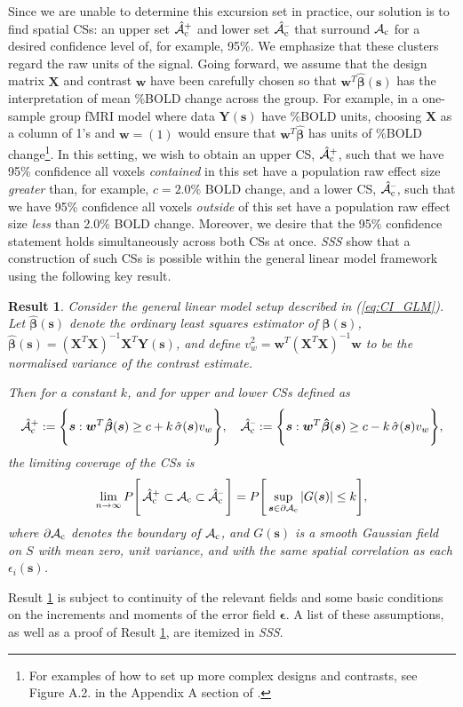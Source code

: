 Since we are unable to determine this excursion set in practice, our solution is to find spatial CSs: an upper set $\operatorname{\hat{\mathcal{A}}_{c}^+}$ and lower set $\operatorname{\hat{\mathcal{A}}_{c}^{\textrm{--}}}$ that surround $\operatorname{\mathcal{A}_{c}}$ for a desired confidence level of, for example, 95\%. We emphasize that these clusters regard the raw units of the signal. Going forward, we assume that the design matrix $\bm{X}$ and contrast $\bm{w}$ have been carefully chosen so that $\bm{w}^{T}\hat{\bm{\beta}}(\bm{s})$ has the interpretation of mean \%BOLD change across the group. For example, in a one-sample group fMRI model where data $\bm{Y}(\bm{s})$ have \%BOLD units, choosing $\bm{X}$ as a column of 1's and $\bm{w}=(1)$ would ensure that $\bm{w}^{T}\hat{\bm{\beta}}$ has units of \%BOLD change\footnote{For examples of how to set up more complex designs and contrasts, see Figure A.2. in the Appendix A section of \citep{Poldrack2011-bw}.}. In this setting, we wish to obtain an upper CS, $\operatorname{\hat{\mathcal{A}}_{c}^+}$, such that we have 95\% confidence all voxels \textit{contained} in this set have a population raw effect size \textit{greater} than, for example, $c = 2.0\%$ BOLD change, and a lower CS, $\operatorname{\hat{\mathcal{A}}_{c}^{\textrm{--}}}$, such that we have 95\% confidence all voxels \textit{outside} of this set have a population raw effect size \textit{less} than 2.0\% BOLD change. Moreover, we desire that the 95\% confidence statement holds simultaneously across both CSs at once.
\textit{SSS} show that a construction of such CSs is possible within the general linear model framework using the following key result. 

\newtheorem{theorem}{Result}
\begin{theorem}
\label{thm:SSS_result}
Consider the general linear model setup described in (\ref{eq:CI_GLM}). Let $\hat{\bm{\beta}}(\bm{s})$ denote the ordinary least squares estimator of $\bm{\beta}(\bm{s})$, $\hat{\bm{\beta}}(\bm{s})=(\bm{X}^T\bm{X})^{-1}\bm{X}^T\bm{Y}(\bm{s})$, and define
$v^{2}_{w}=\bm{w}^T(\bm{X}^T\bm{X})^{-1}\bm{w}$ 
to be the normalised variance of the contrast estimate.

Then for a constant $k$, and for upper and lower CSs defined as
$$\operatorname{\hat{\mathcal{A}}_{c}^+} := \Bigg\{\bm{s} : \bm{w}^{T}\bm{\hat{\beta}}(\bm{s}) \geq c + k\, \hat{\sigma}(\bm{s}) v_{w} \Bigg\}, \quad \operatorname{\hat{\mathcal{A}}_{c}^{\textrm{--}}} := \Bigg\{\bm{s} : \bm{w}^{T}\bm{\hat{\beta}}(\bm{s}) \geq c - k \,\hat{\sigma}(\bm{s}) v_{w}  \Bigg\},$$ 
the limiting coverage of the CSs is
$$\lim_{n\rightarrow\infty} P  \Bigg[\operatorname{\hat{\mathcal{A}}_{c}^+} \subset \operatorname{\mathcal{A}_{c}} \subset \operatorname{\hat{\mathcal{A}}_{c}^{\textrm{--}}}\Bigg] = P \Bigg[\sup_{\bm{s}\in\operatorname{\partial\mathcal{A}_{c}}}|G(\bm{s})|\leq k\Bigg],$$
where $\operatorname{\partial\mathcal{A}_{c}}$ denotes the boundary of $\operatorname{\mathcal{A}_{c}}$, and $G(\bm{s})$ is a smooth Gaussian field on $S$ with mean zero, unit variance, and with the same spatial correlation as each $\epsilon_i(\bm{s})$. 
\end{theorem}
Result \ref{thm:SSS_result} is subject to continuity of the relevant fields and some basic conditions on the increments and moments of the error field $\bm{\epsilon}$. A list of these assumptions, as well as a proof of Result \ref{thm:SSS_result}, are itemized in \textit{SSS}. 


